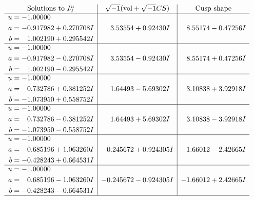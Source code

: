 \documentclass[1p]{elsarticle_modified}
\theoremstyle{definition}
\newcommand{\I}{\sqrt{-1}}
\begin{document}
$$\begin{array}{c|c|c}  
\text{Solutions to }I^u_{2}& \I (\text{vol} + \sqrt{-1}CS) & \text{Cusp shape}\\
 \hline 
\begin{aligned}
u &= -1.00000\phantom{ +0.000000I} \\
a &= -0.917982 + 0.270708 I \\
b &= \phantom{-}1.002190 + 0.295542 I\end{aligned}
 & \phantom{-}3.53554 + 0.92430 I & \phantom{-}8.55174 - 0.47256 I \\ \hline\begin{aligned}
u &= -1.00000\phantom{ +0.000000I} \\
a &= -0.917982 - 0.270708 I \\
b &= \phantom{-}1.002190 - 0.295542 I\end{aligned}
 & \phantom{-}3.53554 - 0.92430 I & \phantom{-}8.55174 + 0.47256 I \\ \hline\begin{aligned}
u &= -1.00000\phantom{ +0.000000I} \\
a &= \phantom{-}0.732786 + 0.381252 I \\
b &= -1.073950 + 0.558752 I\end{aligned}
 & \phantom{-}1.64493 - 5.69302 I & \phantom{-}3.10838 + 3.92918 I \\ \hline\begin{aligned}
u &= -1.00000\phantom{ +0.000000I} \\
a &= \phantom{-}0.732786 - 0.381252 I \\
b &= -1.073950 - 0.558752 I\end{aligned}
 & \phantom{-}1.64493 + 5.69302 I & \phantom{-}3.10838 - 3.92918 I \\ \hline\begin{aligned}
u &= -1.00000\phantom{ +0.000000I} \\
a &= \phantom{-}0.685196 + 1.063260 I \\
b &= -0.428243 + 0.664531 I\end{aligned}
 & -0.245672 + 0.924305 I & -1.66012 - 2.42665 I \\ \hline\begin{aligned}
u &= -1.00000\phantom{ +0.000000I} \\
a &= \phantom{-}0.685196 - 1.063260 I \\
b &= -0.428243 - 0.664531 I\end{aligned}
 & -0.245672 - 0.924305 I & -1.66012 + 2.42665 I\\
 \hline 
 \end{array}$$\newpage\newpage\renewcommand{\arraystretch}{1}
\end{document}
